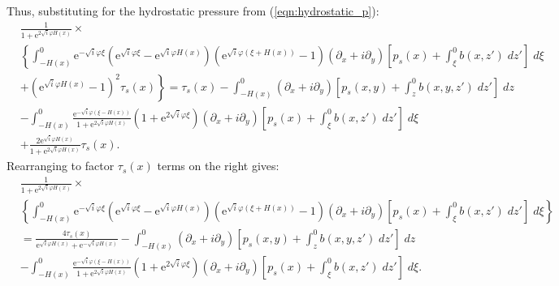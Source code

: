 \documentclass[10pt]{amsart}
\begin{document}
Thus, substituting for the hydrostatic pressure from (\ref{eqn:hydrostatic_p}):
 \begin{align}
& \frac{1}{{ 1 + \mathrm{e}^{2 \sqrt{i} \varphi H(x )} } } \times \nonumber \\
& \left\{
 \int_{-H(x)}^{0} 
\mathrm{e}^{-\sqrt{i} \varphi \xi} 
\left(
\mathrm{e}^{\sqrt{i} \varphi \xi} - 
\mathrm{e}^{\sqrt{i} \varphi H(x)} 
\right) \left(
\mathrm{e}^{\sqrt{i} \varphi  \left( \xi + H(x) \right)} - 1
\right)
 \left( \partial_x  + i \partial_y  \right)
\left[
 p_s (x) + \int_{\xi}^{0} b(x,z') \; dz'  \right]
 \; d \xi   \right. \nonumber \\
& + \left.
\left( 
\mathrm{e}^{\sqrt{i} \varphi  H(x) }   - 1   
\right)^2
\tau_s (x)  \right\} 
 = \tau_s (x) 
 - 
 \int_{-H(x)}^{0} \left( \partial_x + i \partial_y \right) \left[ 
 p_s(x,y) + \int_{z}^{0} b(x,y,z') \; dz'
 \right] \; dz  
  \nonumber \\
&- 
\int_{-H(x)}^{0} 
\frac{ \mathrm{e}^{-\sqrt{i} \varphi (\xi - H(x))  } }{ 1 + \mathrm{e}^{2 \sqrt{i} \varphi H \left(x \right)} }
\left( 1 + \mathrm{e}^{2 \sqrt{i} \varphi \xi}\right) 
  \left( \partial_x  + i \partial_y  \right)
\left[
 p_s (x) + \int_{\xi}^{0} b(x,z') \; dz'  \right]
 \; d \xi \nonumber \\
& +
\frac{ 2 \mathrm{e}^{\sqrt{i} \varphi H(x)  } }{ 1 + \mathrm{e}^{2 \sqrt{i} \varphi H \left(x \right)} }
\tau_s (x)
. \nonumber
\end{align}
Rearranging to factor $\tau_s (x)$ terms on the right gives:
 \begin{align}
& \frac{1}{{1 + \mathrm{e}^{2 \sqrt{i} \varphi H(x )} } } \times \nonumber \\
& \left\{
 \int_{-H(x)}^{0} 
\mathrm{e}^{-\sqrt{i} \varphi \xi} 
\left(
\mathrm{e}^{\sqrt{i} \varphi \xi} - 
\mathrm{e}^{\sqrt{i} \varphi H(x)} 
\right) \left(
\mathrm{e}^{\sqrt{i} \varphi  \left( \xi + H(x) \right)} - 1
\right)
 \left( \partial_x  + i \partial_y  \right)
\left[
 p_s (x) + \int_{\xi}^{0} b(x,z') \; dz'  \right]
 \; d \xi   \right\} \nonumber \\
& = \frac{4 \tau_s (x)}{\mathrm{e}^{\sqrt{i} \varphi H(x)} + \mathrm{e}^{-\sqrt{i} \varphi H(x)}}  
 - 
\int_{-H(x)}^{0} \left( \partial_x + i \partial_y \right) \left[ 
 p_s(x,y) + \int_{z}^{0} b(x,y,z') \; dz'
 \right] \; dz  
  \nonumber \\
&- 
\int_{-H(x)}^{0} 
\frac{ \mathrm{e}^{-\sqrt{i} \varphi (\xi - H(x))  } }{ 1 + \mathrm{e}^{2 \sqrt{i} \varphi H \left(x \right)} }
\left( 1 + \mathrm{e}^{2 \sqrt{i} \varphi \xi}\right) 
  \left( \partial_x  + i \partial_y  \right)
\left[
 p_s (x) + \int_{\xi}^{0} b(x,z') \; dz'  \right]
 \; d \xi 
. \nonumber
\end{align}
\end{document}
